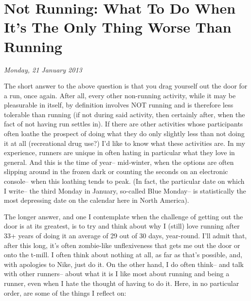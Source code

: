 \chapter{Not Running: What To Do When It's The Only Thing Worse Than Running}
\textit{Monday, 21 January 2013}
\bigskip



The short answer to the above question is that you drag yourself out the door for a run, once again. After all, every other non-running activity, while it may be pleasurable in itself, by definition involves NOT running and is therefore less tolerable than running (if not during said activity, then certainly after, when the fact of not having run settles in). If there are other activities whose participants often loathe the prospect of doing what they do only slightly less than not doing it at all (recreational drug use?) I'd like to know what these activities are. In my experience, runners are unique in often hating in particular what they love in general. And this is the time of year-- mid-winter, when the options are often slipping around in the frozen dark or counting the seconds on an electronic console-- when this loathing tends to peak. (In fact, the particular date on which I write-- the third Monday in January, so-called Blue Monday-- is statistically the most depressing date on the calendar here in North America).

The longer answer, and one I contemplate when the challenge of getting out the door is at its greatest, is to try and think about why I (still) love running after 33+ years of doing it an average of 29 out of 30 days, year-round. I'll admit that, after this long, it's often zombie-like unflexiveness that gets me out the door or onto the t-mill. I often think about nothing at all, as far as that's possible, and, with apologies to Nike, just do it. On the other hand, I do often think-- and talk with other runners-- about what it is I like most about running and being a runner, even when I hate the thought of having to do it. Here, in no particular order, are some of the things I reflect on:

